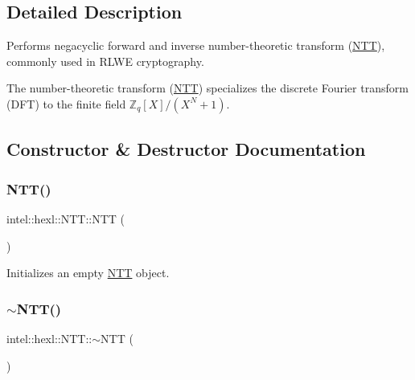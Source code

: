 \subsection{Detailed Description}
Performs negacyclic forward and inverse number-\/theoretic transform (\hyperlink{classintel_1_1hexl_1_1NTT}{N\+TT}), commonly used in R\+L\+WE cryptography. 

The number-\/theoretic transform (\hyperlink{classintel_1_1hexl_1_1NTT}{N\+TT}) specializes the discrete Fourier transform (D\+FT) to the finite field $ \mathbb{Z}_q[X] / (X^N + 1) $. 

\subsection{Constructor \& Destructor Documentation}
\mbox{\label{classintel_1_1hexl_1_1NTT_ad31a184065b07b50c3ff01260f6dad28}} 
\subsubsection{\texorpdfstring{N\+T\+T()}{NTT()}\hspace{0.1cm}{\footnotesize\ttfamily [1/5]}}
{\footnotesize\ttfamily intel\+::hexl\+::\+N\+T\+T\+::\+N\+TT (\begin{DoxyParamCaption}{ }\end{DoxyParamCaption})\hspace{0.3cm}{\ttfamily [default]}}



Initializes an empty \hyperlink{classintel_1_1hexl_1_1NTT}{N\+TT} object. 

\mbox{\label{classintel_1_1hexl_1_1NTT_a4fbb886db7389f6a5bac264a3e0cf66f}} 
\subsubsection{\texorpdfstring{$\sim$\+N\+T\+T()}{~NTT()}}
{\footnotesize\ttfamily intel\+::hexl\+::\+N\+T\+T\+::$\sim$\+N\+TT (\begin{DoxyParamCaption}{ }\end{DoxyParamCaption})\hspace{0.3cm}{\ttfamily [default]}}



